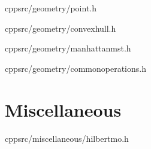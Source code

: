 \documentclass[portrait, 8pt, a4paper, oneside, twocolumn]{extarticle}
\begin{document}
    {}
    {}
    {cpp}{src/geometry/point.h}
    \noindent\hrulefill

    {}
    {}
    {cpp}{src/geometry/convexhull.h}
    \noindent\hrulefill

    {}
    {}
    {cpp}{src/geometry/manhattanmst.h}
    \noindent\hrulefill

    {}
    {}
    {cpp}{src/geometry/commonoperations.h}
    \noindent\hrulefill

\section{Miscellaneous}

    {}
    {}
    {cpp}{src/miscellaneous/hilbertmo.h}
    \noindent\hrulefill




\end{document}
